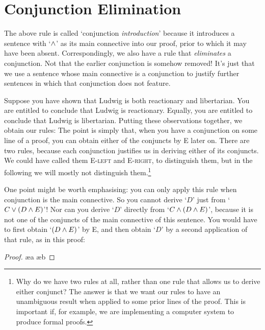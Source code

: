 \section{Conjunction Elimination}\label{conjelim}

The above rule is called `conjunction \emph{introduction}' because it introduces a sentence with `$\wedge$' as its main connective into our proof, prior to which it may have been absent. Correspondingly, we also have a rule that \emph{eliminates} a conjunction. Not that the earlier conjunction is somehow removed! It's just that we use a sentence whose main connective is a conjunction to justify further sentences in which that conjunction does not feature.

Suppose you have shown that Ludwig is both reactionary and libertarian. You are entitled to conclude that Ludwig is reactionary. Equally, you are entitled to conclude that Ludwig is libertarian. Putting these observations together, we obtain our  rules:
The point is simply that, when you have a conjunction on some line of a proof, you can obtain either of the conjuncts by {\eand}E later on. There are two rules, because each conjunction justifies us in deriving either of its conjuncts. We could have called them {\eand}E-\textsc{left} and {\eand}E-\textsc{right}, to distinguish them, but in the following we will mostly not distinguish them.\footnote{Why do we have two rules at all, rather than one rule that allows us to derive either conjunct? The answer is that we want our rules to have an unambiguous result when applied to some prior lines of the proof. This is important if, for example, we are implementing a computer system to produce formal proofs.}


 One point might be worth emphasising: you can only apply this rule when conjunction is the main connective. So you cannot derive `$D$' just from `$C \vee (D \wedge E)$'! Nor can you derive `$D$' directly from `$C \wedge (D \wedge E)$', because it is not one of the conjuncts of the main connective of this sentence. You would have to first obtain `$(D \wedge E)$' by {\eand}E, and then obtain `$D$' by a second application of that rule, as in this proof: \begin{proof}
 	\ae{a}
 	\ae{b}
 \end{proof}

